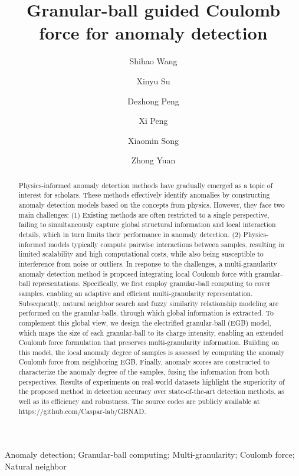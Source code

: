 \documentclass[times, review, 10pt]{elsarticle}
\begin{document}
\begin{frontmatter}

\title{Granular-ball guided Coulomb force for anomaly detection}
\author[adr1]{Shihao Wang}
\author[adr1]{Xinyu Su}
\author[adr1]{Dezhong Peng}
\author[adr1]{Xi Peng}
\author[adr2]{Xiaomin Song}
\author[adr1]{Zhong Yuan}


\address[adr1]{College of Computer Science, Sichuan University, Chengdu 610065, China}
\address[adr2]{Sichuan National Innovation New Vision UHD Video Technology Co., Ltd, Chengdu 610095, China}


\begin{abstract}

Physics-informed anomaly detection methods have gradually emerged as a topic of interest for scholars. {These methods effectively identify anomalies by constructing anomaly detection models based on the concepts from physics.}
However, they face two main challenges: 
{(1) Existing methods are often restricted to a single perspective, failing to simultaneously capture global structural information and local interaction details, which in turn limits their performance in anomaly detection.} (2) Physics-informed models typically compute pairwise interactions between samples, resulting in limited scalability and high computational costs, while also being susceptible to interference from noise or outliers.
In response to the challenges, a multi-granularity anomaly detection method is proposed integrating local Coulomb force with granular-ball representations.
Specifically, we first employ granular-ball computing to cover samples, enabling an adaptive and efficient multi-granularity representation.
Subsequently, natural neighbor search and fuzzy similarity relationship modeling are performed on the granular-balls, through which global information is extracted.
{To complement this global view, we design the electrified granular-ball (EGB) model, which maps the size of each granular-ball to its charge intensity, enabling an extended Coulomb force formulation that preserves multi-granularity information.}
Building on this model, the local anomaly degree of samples is assessed by computing the anomaly Coulomb force from neighboring EGB.
Finally, anomaly scores are constructed to characterize the anomaly degree of the samples, fusing the information from both perspectives.
Results of experiments on real-world datasets highlight the superiority of the proposed method in detection accuracy over state-of-the-art detection methods, as well as its efficiency and robustness. The source codes are publicly available at https://github.com/Caspar-lab/GBNAD.

\end{abstract}
\begin{keyword}
Anomaly detection; Granular-ball computing; Multi-granularity;  Coulomb force; Natural neighbor
\end{keyword}

\end{frontmatter}
\end{document}
